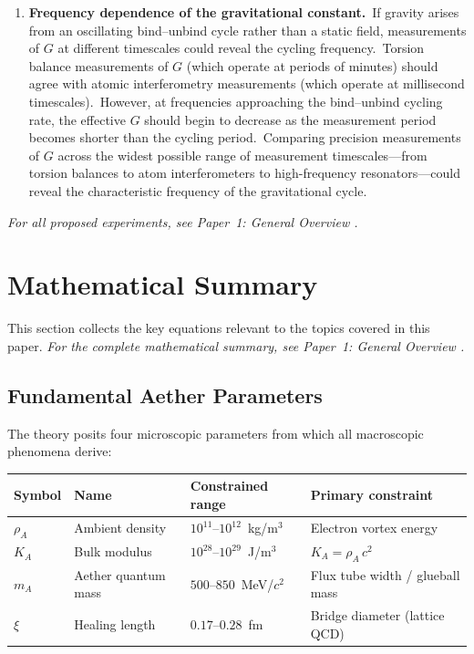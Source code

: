 ﻿\documentclass[12pt,letterpaper]{article}
\newcommand{\rhoa}{\rho_{\!A}}
\newcommand{\Ka}{K_{\!A}}
\begin{document}
\begin{enumerate}[leftmargin=2em]
  \item \textbf{Frequency dependence of the gravitational constant.}\
    If gravity arises from an oscillating bind--unbind cycle rather than a static
    field, measurements of $G$ at different timescales could reveal the cycling
    frequency.\ Torsion balance measurements of $G$ (which operate at periods
    of minutes) should agree with atomic interferometry measurements (which
    operate at millisecond timescales).\ However, at frequencies approaching the
    bind--unbind cycling rate, the effective $G$ should begin to decrease as the
    measurement period becomes shorter than the cycling period.\ Comparing
    precision measurements of $G$ across the widest possible range of measurement
    timescales---from torsion balances to atom interferometers to high-frequency
    resonators---could reveal the characteristic frequency of the gravitational
    cycle.

\end{enumerate}

\noindent\textit{For all proposed experiments, see Paper~1: General Overview \cite{otto-overview}.}


\section{Mathematical Summary}

This section collects the key equations relevant to the topics covered in this paper.
\noindent\textit{For the complete mathematical summary, see Paper~1: General Overview \cite{otto-overview}.}

\subsection{Fundamental Aether Parameters}

The theory posits four microscopic parameters from which all macroscopic
phenomena derive:
%
\begin{center}
\begin{tabular}{@{}llll@{}}
\hline
\textbf{Symbol} & \textbf{Name} & \textbf{Constrained range} & \textbf{Primary constraint} \\
\hline
$\rhoa$  & Ambient density     & $10^{11}$--$10^{12}$~kg/m$^3$         & Electron vortex energy \\
$\Ka$    & Bulk modulus         & $10^{28}$--$10^{29}$~J/m$^3$          & $\Ka = \rhoa\,c^2$ \\
$m_A$    & Aether quantum mass  & $500$--$850$~MeV/$c^2$                & Flux tube width / glueball mass \\
$\xi$    & Healing length       & $0.17$--$0.28$~fm                     & Bridge diameter (lattice QCD) \\
\hline
\end{tabular}
\end{center}
\end{document}
